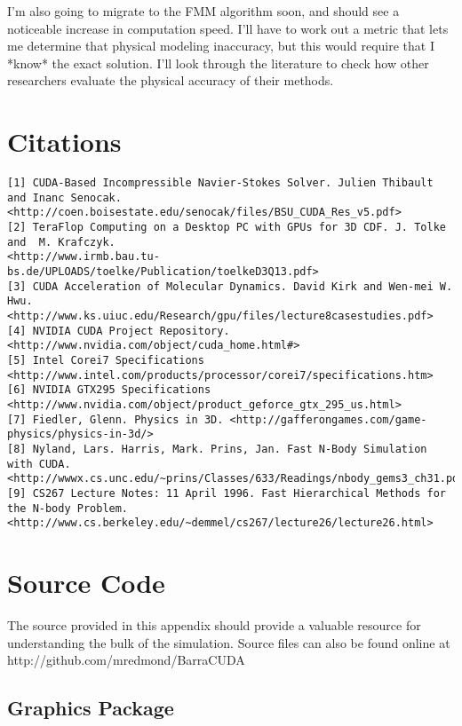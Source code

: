 \documentclass[10pt]{article}
\begin{document}
I'm also going to migrate to the FMM algorithm soon, and should see a noticeable increase in computation speed. I'll have to work out a metric that lets me determine that physical modeling inaccuracy, but this would require that I *know* the exact solution. I'll look through the literature to check how other researchers evaluate the physical accuracy of their methods.


\section{Citations}


\begin{verbatim}
[1] CUDA-Based Incompressible Navier-Stokes Solver. Julien Thibault and Inanc Senocak.
<http://coen.boisestate.edu/senocak/files/BSU_CUDA_Res_v5.pdf>
[2] TeraFlop Computing on a Desktop PC with GPUs for 3D CDF. J. Tolke and  M. Krafczyk.  
<http://www.irmb.bau.tu-bs.de/UPLOADS/toelke/Publication/toelkeD3Q13.pdf>
[3] CUDA Acceleration of Molecular Dynamics. David Kirk and Wen-mei W. Hwu.  
<http://www.ks.uiuc.edu/Research/gpu/files/lecture8casestudies.pdf>
[4] NVIDIA CUDA Project Repository. <http://www.nvidia.com/object/cuda_home.html#>
[5] Intel Corei7 Specifications <http://www.intel.com/products/processor/corei7/specifications.htm>
[6] NVIDIA GTX295 Specifications <http://www.nvidia.com/object/product_geforce_gtx_295_us.html>
[7] Fiedler, Glenn. Physics in 3D. <http://gafferongames.com/game-physics/physics-in-3d/>
[8] Nyland, Lars. Harris, Mark. Prins, Jan. Fast N-Body Simulation with CUDA. 
<http://wwwx.cs.unc.edu/~prins/Classes/633/Readings/nbody_gems3_ch31.pdf>
[9] CS267 Lecture Notes: 11 April 1996. Fast Hierarchical Methods for the N-body Problem.
<http://www.cs.berkeley.edu/~demmel/cs267/lecture26/lecture26.html>
\end{verbatim}

\appendix
\section{Source Code}
The source provided in this appendix should provide a valuable resource for understanding the bulk of the simulation. Source files can also be found online at http://github.com/mredmond/BarraCUDA

\subsection{Graphics Package}
\end{document}
